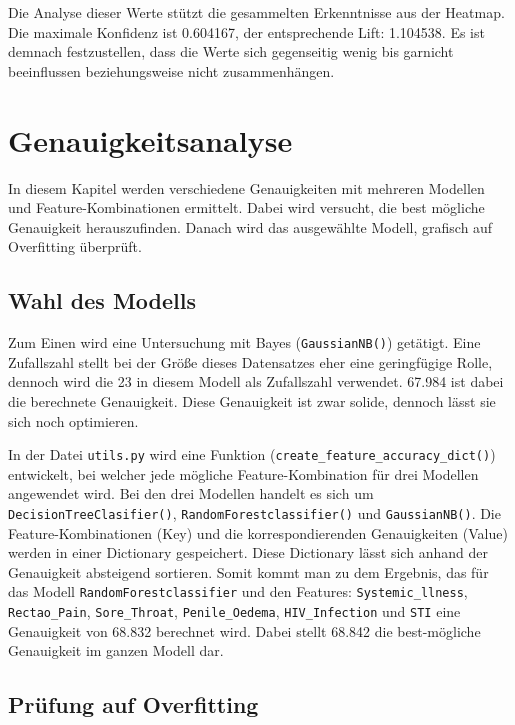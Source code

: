 \documentclass[13pt,a4paper, listof=entryprefix, bibliography=totocnumbered,toc=listofnumbered,lof=listofnumbered]{scrartcl}
\begin{document}
	Die Analyse dieser Werte stützt die gesammelten Erkenntnisse aus der Heatmap. Die maximale Konfidenz ist 0.604167, der entsprechende Lift:
	1.104538. Es ist demnach festzustellen, dass die Werte sich gegenseitig wenig bis garnicht beeinflussen beziehungsweise nicht zusammenhängen. 


	\section{Genauigkeitsanalyse}
		\label{ch:genauigkeit_analyse}

	In diesem Kapitel werden verschiedene Genauigkeiten mit mehreren Modellen und Feature-Kombinationen ermittelt. Dabei wird versucht, die best mögliche Genauigkeit herauszufinden. 
	Danach wird das ausgewählte Modell, grafisch auf Overfitting überprüft.  

	\subsection{Wahl des Modells}
		\label{ch:wahl_modell}

	Zum Einen wird eine Untersuchung mit Bayes (\lstinline{GaussianNB()}) getätigt. Eine Zufallszahl stellt bei der Größe dieses Datensatzes eher eine geringfügige
	Rolle, dennoch wird die 23 in diesem Modell als Zufallszahl verwendet. 67.984 ist dabei die berechnete Genauigkeit. Diese Genauigkeit ist zwar solide, 
	dennoch lässt sie sich noch optimieren. 

	In der Datei \lstinline{utils.py} wird eine Funktion (\lstinline{create_feature_accuracy_dict()}) entwickelt, bei welcher jede mögliche Feature-Kombination für drei Modellen angewendet wird. Bei den drei Modellen handelt es sich um 
	\lstinline{DecisionTreeClasifier()}, \lstinline{RandomForestclassifier()} und \lstinline{GaussianNB()}. Die Feature-Kombinationen (Key) und die korrespondierenden Genauigkeiten (Value) werden in 
	einer Dictionary gespeichert. Diese Dictionary lässt sich anhand der Genauigkeit absteigend sortieren. Somit kommt man zu dem Ergebnis, das für das Modell \lstinline{RandomForestclassifier} und 
	den Features: \lstinline{Systemic_llness}, \lstinline{Rectao_Pain}, \lstinline{Sore_Throat}, \lstinline{Penile_Oedema}, \lstinline{HIV_Infection} und \lstinline{STI} eine Genauigkeit von 68.832 berechnet wird. Dabei stellt
	68.842 die best-mögliche Genauigkeit im ganzen Modell dar. 

	\subsection{Prüfung auf Overfitting}
		\label{ch:pruefung_overfitting}
\end{document}

